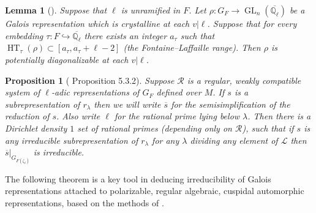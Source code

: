 \documentclass{amsart}
\newtheorem{lemma}[theorem]{Lemma}
\newtheorem{proposition}[theorem]{Proposition}
\theoremstyle{definition}
\numberwithin{equation}{section} %
\newcommand{\GL}{\operatorname{GL}}
\newcommand{\Qlbar}{\ensuremath{\overline{\mathbb{Q}_\ell}}}
\newcommand{\HT}{\operatorname{HT}}
\newcommand{\mc}[1]{\mathcal{#1}}
\newcommand{\ol}[1]{\overline{#1}}
\begin{document}
\begin{lemma}[{\cite[Lemma 1.4.3]{BLGGT14}}] \label{lemma: potentially diagonalizable}
Suppose that $\ell$ is unramified in $F$.
Let $\rho: G_F \to \GL_n(\Qlbar)$ be a Galois representation which is crystalline at each $v|\ell$.
Suppose that for every embedding $\tau: F \hookrightarrow \Qlbar$ there exists an integer $a_\tau$ such that $\HT_{\tau}(\rho) \subset [a_\tau, a_\tau + \ell - 2]$ (the Fontaine--Laffaille range).
Then $\rho$ is potentially diagonalizable at each $v|\ell$.
\end{lemma}

\begin{proposition}[\cite{BLGGT14} Proposition 5.3.2] \label{proposition: density 1 residual irreducibility of summands}
    Suppose \( \mc{R} \) is a regular, weakly compatible system of \( \ell \)-adic representations of \( G_F \) defined over \( M \). If \( s \) is a subrepresentation of \( r_\lambda \) then we will write \( \ol{s} \) for the semisimplification of the reduction of \( s \). Also write \( \ell \) for the rational prime lying below \( \lambda \). Then there is a Dirichlet density \( 1 \) set of rational primes (depending only on \( \mc{R} \)), such that if \( s \) is any irreducible subrepresentation of \( r_\lambda \) for any \( \lambda \) dividing any element of \( \mc{L} \) then \( \ol{s}|_{G_{F(\zeta_\ell)}} \) is irreducible.
\end{proposition}

The following theorem is a key tool in deducing irreducibility of Galois representations attached to polarizable, regular algebraic, cuspidal automorphic representations, based on the methods of \cite{BLGGT14}.
\end{document}
